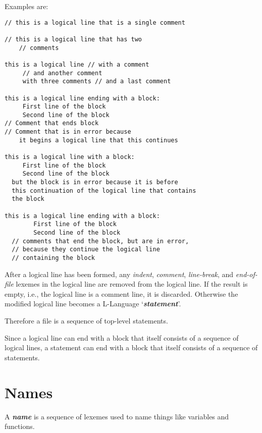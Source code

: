 \documentclass[12pt]{article}
\makeatletter
\newcommand{\key}[1]{{\bf \em #1}\index{#1}}
\newcommand{\emkey}[1]{{\bf \em #1}\index{#1@{\em #1}}}
\newenvironment{indpar}[1][0.3in]%
	{\begin{list}{}%
		     {\setlength{\itemsep}{0in}%
		      \setlength{\topsep}{0in}%
		      \setlength{\parsep}{1ex}%
		      \setlength{\labelwidth}{#1}%
		      \setlength{\leftmargin}{#1}%
		      \addtolength{\leftmargin}{\labelsep}}%
	 \item}%
	{\end{list}}
\makeatother
\begin{document}
Examples are:
\begin{indpar}\begin{verbatim}
// this is a logical line that is a single comment

// this is a logical line that has two
    // comments

this is a logical line // with a comment
     // and another comment
     with three comments // and a last comment

this is a logical line ending with a block:
     First line of the block
     Second line of the block
// Comment that ends block
// Comment that is in error because
    it begins a logical line that this continues

this is a logical line with a block:
     First line of the block
     Second line of the block
  but the block is in error because it is before
  this continuation of the logical line that contains
  the block

this is a logical line ending with a block:
        First line of the block
        Second line of the block
  // comments that end the block, but are in error,
  // because they continue the logical line
  // containing the block
\end{verbatim}\end{indpar}

After a logical line
has been formed, any {\em indent},
{\em comment}, {\em line-break}, and {\em end-of-file}
lexemes in the logical line
are removed from the logical line.  If the result is
empty, i.e., the logical line is a comment line, it is discarded.
Otherwise the
modified logical line becomes a L-Language `\emkey{statement}'.

Therefore a file is a sequence of top-level statements.

Since a logical line can end with a block that itself consists
of a sequence of logical lines, a statement can end with
a block that itself consists of a sequence of statements.


\section{Names}
\label{NAMES}

A \key{name} is a sequence of lexemes used to name things like
variables and functions.
\end{document}
